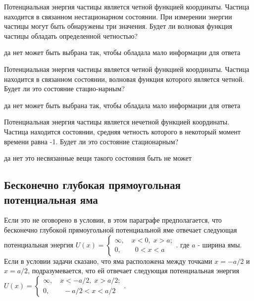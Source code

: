 \documentclass[11pt,a4paper]{exam}
\begin{document}
\begin{questions}
\question Потенциальная энергия частицы является четной функцией координаты. Частица находится в связанном нестационарном состоянии. При измерении энергии частицы могут быть обнаружены три значения. Будет ли волновая функция частицы обладать определенной четностью?
\begin{choices}
\choice да
\choice нет
\choice может быть выбрана так, чтобы обладала
\choice мало информации для ответа
\end{choices}

\question Потенциальная энергия частицы является четной функцией координаты. Частица находится в связанном состоянии, волновая функция которого является четной. Будет ли это состояние стацио-нарным? 
\begin{choices}
\choice да
\choice нет
\choice может быть выбрана так, чтобы обладала
\choice мало информации для ответа
\end{choices}

\question Потенциальная энергия частицы является нечетной функцией координаты. Частица находится состоянии, средняя четность которого в некоторый момент времени равна -1. Будет ли это состояние стационарным?
\begin{choices}
\choice да
\choice нет
\choice это несвязанные вещи
\choice такого состояния быть не может
\end{choices}

\end{questions}




\subsection{ Бесконечно глубокая прямоугольная потенциальная яма }
Если это не оговорено в условии, в этом параграфе предполагается, что бесконечно глубокой прямоугольной потенциальной яме отвечает следующая потенциальная энергия
$U(x) = \left\{ {\begin{array}{*{20}{c}}
{\infty ,\quad x < 0,\;x > a;}\\
{0,\quad \quad 0 < x < a}
\end{array}} \right.$.
где $a$ - ширина ямы. Если в условии задачи сказано, что яма расположена между точками $x =  - a/2$ и $x = a/2$, подразумевается, что ей отвечает следующая потенциальная энергия
$U(x) = \left\{ {\begin{array}{*{20}{c}}
{\infty ,\quad x <  - a/2,\;x > a/2;}\\
{0,\quad \quad  - a/2 < x < a/2}
\end{array}} \right.$.
\end{document}
